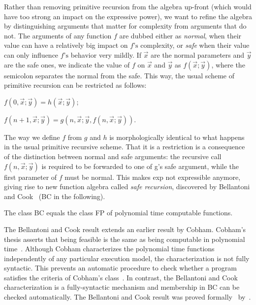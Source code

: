 Rather than removing primitive recursion from the algebra up-front (which would have too strong an impact on the expressive power), %
we want to refine the algebra by distinguishing arguments that matter for complexity from arguments that do not.
The arguments of any function \(f\) are dubbed either as \emph{normal}, when their value can have a relatively big impact on \(f\text{'s}\) complexity, or \emph{safe} when their value can only influence \(f\)\(\text{'s}\) behavior very mildly. %
If \(\vec{x}\) are the normal parameters and \(\vec{y}\) are the safe ones,
we indicate the value of \(f\) on \(\vec{x}\) and \(\vec{y}\) as \(f(\vec{x};\vec{y})\),
where the semicolon separates the normal from the safe.
This way, the usual scheme of primitive recursion can be restricted as follows:

\begin{center}
    \(f (0, \vec{x};\vec{y}) = h (\vec{x};\vec{y})\);

    \(f (n + 1,\vec{x};{ }\vec{y}) = g (n, \vec{x}; \vec{y}, f(n,\vec{x}; \vec{y})) \).
\end{center}

\noindent The way we define \(f\) from \(g\) and \(h\) is morphologically identical to what happens in the usual primitive recursive scheme.
That it is a restriction is a consequence of the distinction between normal and safe arguments: the recursive call \(f(n,\vec{x}; \vec{y})\) is required to be forwarded to one of g's safe argument, while the first parameter of \(f\) must be normal.
This makes exp not expressible anymore, giving rise to new function algebra called \emph{safe recursion}, discovered by Bellantoni and Cook~\cite{bellantoni1992} (BC in the following).

\begin{theorem}
The class BC equals the class FP of polynomial time computable functions.
\end{theorem}

The Bellantoni and Cook result extends an earlier result by Cobham.
Cobham's thesis asserts that being feasible is the same as being computable in polynomial time~\cite{cobham1965}.
Although Cobham characterizes the polynomial time functions independently of any particular execution model, the characterization is not fully syntactic.
This prevents an automatic procedure to check whether a program satisfies the criteria of Cobham's class~\cite{heraud2011}.
In contrast, the Bellantoni and Cook characterization is a fully-syntactic mechanism and membership in BC can be checked automatically.
The Bellantoni and Cook result was proved formally~\cite{bc_formal} by~\textcite{heraud2011}.

